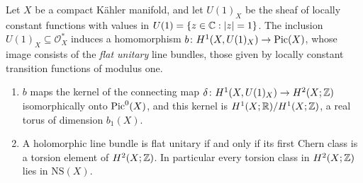 \begin{proposition}\label{lefschetz-11:proposition-flat}
Let $X$ be a compact K\"ahler manifold, and let $U(1)_X$ be the sheaf of locally constant functions with values in $U(1) = \{z \in \mathbb{C} : |z| = 1\}$. The inclusion $U(1)_X \subseteq \mathcal{O}_X^*$ induces a
homomorphism $b \colon H^1(X, U(1)_X) \to \operatorname{Pic}(X)$, whose image consists of the \emph{flat unitary} line bundles, those given by locally constant transition functions of modulus one.
\begin{enumerate}
\item $b$ maps the kernel of the connecting map $\delta \colon H^1(X, U(1)_X) \to H^2(X; \mathbb{Z})$ isomorphically onto $\operatorname{Pic}^0(X)$, and this kernel is $H^1(X; \mathbb{R})/H^1(X; \mathbb{Z})$, a real torus of dimension $b_1(X)$.
\item A holomorphic line bundle is flat unitary if and only if its first Chern class is a torsion element of $H^2(X; \mathbb{Z})$. In particular every torsion class in $H^2(X; \mathbb{Z})$ lies in $\mathrm{NS}(X)$.
\end{enumerate}
\end{proposition}

